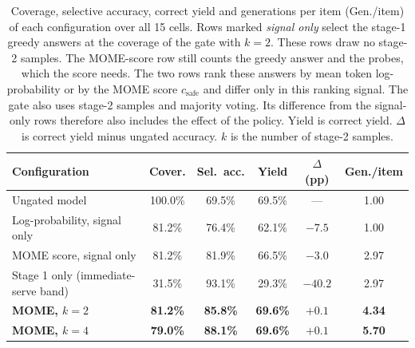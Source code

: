 \begin{table}[t]
\small\setlength{\tabcolsep}{3pt}
\caption{Coverage, selective accuracy, correct yield and generations per item (Gen./item) of each configuration over all 15 cells. Rows marked \emph{signal only} select the stage-1 greedy answers at the coverage of the gate with $k=2$. These rows draw no stage-2 samples. The MOME-score row still counts the greedy answer and the probes, which the score needs. The two rows rank these answers by mean token log-probability or by the MOME score $c_{\mathrm{safe}}$ and differ only in this ranking signal. The gate also uses stage-2 samples and majority voting. Its difference from the signal-only rows therefore also includes the effect of the policy. Yield is correct yield. $\Delta$ is correct yield minus ungated accuracy. $k$ is the number of stage-2 samples.\label{tab:main}}
\begin{tabularx}{\textwidth}{lCCCCC}
\toprule
\textbf{Configuration} & \textbf{Cover.} & \textbf{Sel.\ acc.} & \textbf{Yield} & \textbf{$\Delta$ (pp)} & \textbf{Gen./item} \\
\midrule
Ungated model & 100.0\% & 69.5\% & 69.5\% & --- & 1.00 \\
Log-probability, signal only & 81.2\% & 76.4\% & 62.1\% & $-7.5$ & 1.00 \\
MOME score, signal only & 81.2\% & 81.9\% & 66.5\% & $-3.0$ & 2.97 \\
Stage 1 only (immediate-serve band) & 31.5\% & 93.1\% & 29.3\% & $-40.2$ & 2.97 \\
\textbf{MOME, $k=2$} & \textbf{81.2\%} & \textbf{85.8\%} & \textbf{69.6\%} & \textbf{$+0.1$} & \textbf{4.34} \\
\midrule
\textbf{MOME, $k=4$} & \textbf{79.0\%} & \textbf{88.1\%} & \textbf{69.6\%} & \textbf{$+0.1$} & \textbf{5.70} \\
\bottomrule
\end{tabularx}
\end{table}

